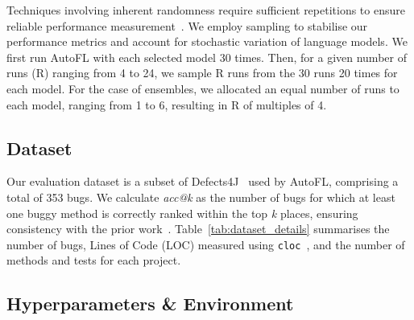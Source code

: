 Techniques involving inherent randomness require sufficient repetitions to ensure reliable performance measurement~\cite{Arcuri2011ee}. We employ sampling to stabilise our performance metrics and account for stochastic variation of language models. We first run AutoFL with each selected model 30 times. Then, for a given number of runs (R) ranging from 4 to 24, we sample R runs from the 30 runs 20 times for each model. For the case of ensembles, we allocated an equal number of runs to each model, ranging from 1 to 6, resulting in R of multiples of 4.

\subsection{Dataset}

Our evaluation dataset is a subset of Defects4J~\cite{just2014defects4j} used by AutoFL, comprising a total of 353 bugs. We calculate \textit{acc@k} as the number of bugs for which at least one buggy method is correctly ranked within the top \textit{k} places, ensuring consistency with the prior work~\cite{kangQuantitativeQualitativeEvaluation2024a}. Table~\ref{tab:dataset_details} summarises the number of bugs, Lines of Code (LOC) measured using \texttt{cloc}~\cite{adanial_cloc}, and the number of methods and tests for each project.

\begin{table}[htbp]
\caption{Evaluation Dataset Details}
\begin{center}
\label{tab:dataset_details}
\end{center}
\end{table}

\subsection{Hyperparameters \& Environment}

